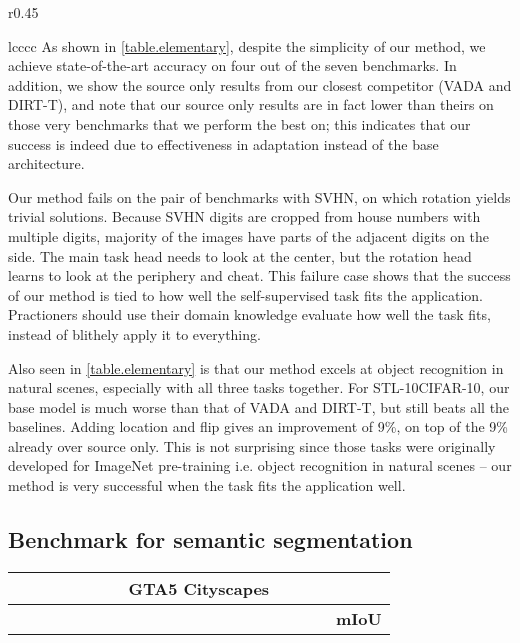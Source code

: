 \documentclass{article} \usepackage{iclr2020_conference,times}
\newcommand*\rot{\rotatebox{90}}
\begin{document}
\begin{wraptable}{r}{0.45\textwidth}
\begin{tabular}{lcccc}
As shown in \autoref{table.elementary}, despite the simplicity of our method, we achieve state-of-the-art accuracy on four out of the seven benchmarks.
In addition, we show the source only results from our closest competitor (VADA and DIRT-T), and note that our source only results are in fact lower than theirs on those very benchmarks that we perform the best on; this indicates that our success is indeed due to effectiveness in adaptation instead of the base architecture. 

Our method fails on the pair of benchmarks with SVHN, on which rotation yields trivial solutions. 
Because SVHN digits are cropped from house numbers with multiple digits, majority of the images have parts of the adjacent digits on the side.
The main task head needs to look at the center, but the rotation head learns to look at the periphery and cheat.
This failure case shows that the success of our method is tied to how well the self-supervised task fits the application.
Practioners should use their domain knowledge evaluate how well the task fits, instead of blithely apply it to everything.

Also seen in \autoref{table.elementary} is that our method excels at object recognition in natural scenes, especially with all three tasks together.
For STL-10CIFAR-10, our base model is much worse than that of VADA and DIRT-T, but still beats all the baselines.
Adding location and flip gives an improvement of 9\%, on top of the 9\% already over source only.
This is not surprising since those tasks were originally developed for ImageNet pre-training i.e. object recognition in natural scenes
-- our method is very successful when the task fits the application well.

\subsection{Benchmark for semantic segmentation}
\label{gta2cityscapes}
\begin{table*}
\vspace{-3ex}

  \begin{center}
  \scriptsize
  \setlength{\tabcolsep}{2.5pt}
  \begin{tabular}{lcccccccccccccccccccc}
    \toprule
    \multicolumn{21}{c}{\textbf{GTA5  Cityscapes}} \\
    \midrule
     & \rot{road} & \rot{sidewalk} & \rot{building} & \rot{wall} & \rot{fence} & \rot{pole} & \rot{traffic light} & \rot{traffic sign} & \rot{vegetation} & \rot{terrain} & \rot{sky} & \rot{person} & \rot{rider} & \rot{car} & \rot{truck} & \rot{bus} & \rot{train} & \rot{motorbike} & \rot{bicycle} & \textbf{mIoU} \\ \midrule


\end{tabular}
\end{center}
\end{table*}
\end{tabular}
\end{wraptable}
\end{document}
